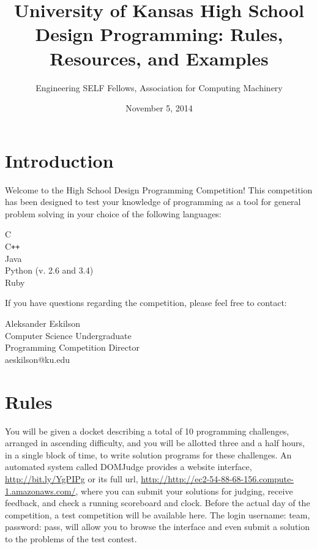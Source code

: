 \documentclass[a4paper]{article}
\title{University of Kansas High School Design Programming: Rules, Resources, and Examples}
\date{November 5, 2014}
\author{Engineering SELF Fellows, Association for Computing Machinery}
\begin{document}
\lstset{
    language=java,
    basicstyle=\ttfamily,
    numbers=left,
    numbersep=8pt,
    showspaces=false,
    showstringspaces=false
}
\maketitle

\tableofcontents

\newpage

\section{Introduction}

Welcome to the High School Design Programming Competition! This competition has been designed to test your knowledge of programming as a tool for general problem solving in your choice of the following languages:
\begin{center}
    C \\
    C\texttt{++} \\
    Java \\ 
    Python (v. 2.6 and 3.4) \\
    Ruby \\
\end{center}

If you have questions regarding the competition, please feel free to contact:
\begin{center}
    Aleksander Eskilson \\
    Computer Science Undergraduate \\
    Programming Competition Director \\
    aeskilson@ku.edu \\
\end{center}

\newpage

\section{Rules}

You will be given a docket describing a total of 10 programming challenges, arranged in ascending difficulty, and you will be allotted three and a half hours, in a single block of time, to write solution programs for these challenges. An automated system called DOMJudge provides a website interface, \url{http://bit.ly/YgPIPg} or its full url, \url{http://http://ec2-54-88-68-156.compute-1.amazonaws.com/}, where you can submit your solutions for judging, receive feedback, and check a running scoreboard and clock. Before the actual day of the competition, a test competition will be available here. The login username: team, password: pass, will allow you to browse the interface and even submit a solution to the problems of the test contest. 
\end{document}
